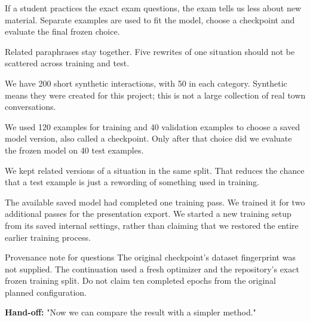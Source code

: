 \documentclass[11pt,a4paper]{article}
\newcommand{\pagehead}[3]{\clearpage{\color{forest}\small\ttfamily #1 \hfill #3}\par\vspace{3pt}{\LARGE\bfseries #2}\par\vspace{5pt}}
\newcommand{\subhead}[1]{\par\vspace{7pt}\noindent{\large\bfseries\color{forest}#1}\par\nobreak\vspace{2pt}}
\newcommand{\handoff}[1]{\vfill{\small\color{forest}\textbf{Hand-off:} #1}\par}
\begin{document}
\pagehead{TRAINING}{Teach, choose, then test}{Gayatri}
\label{training}
\begin{center}
\end{center}
\subhead{Why three sets?}
If a student practices the exact exam questions, the exam tells us less about new material. Separate examples are used to fit the model, choose a checkpoint and evaluate the final frozen choice.

Related paraphrases stay together. Five rewrites of one situation should not be scattered across training and test.
\begin{saybox}
We have 200 short synthetic interactions, with 50 in each category. Synthetic means they were created for this project; this is not a large collection of real town conversations.

We used 120 examples for training and 40 validation examples to choose a saved model version, also called a checkpoint. Only after that choice did we evaluate the frozen model on 40 test examples.

We kept related versions of a situation in the same split. That reduces the chance that a test example is just a rewording of something used in training.

The available saved model had completed one training pass. We trained it for two additional passes for the presentation export. We started a new training setup from its saved internal settings, rather than claiming that we restored the entire earlier training process.
\end{saybox}
\begin{notebox}{Provenance note for questions}
The original checkpoint's dataset fingerprint was not supplied. The continuation used a fresh optimizer and the repository's exact frozen training split. Do not claim ten completed epochs from the original planned configuration.
\end{notebox}
\handoff{"Now we can compare the result with a simpler method."}
\end{document}
